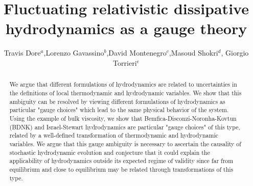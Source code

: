 \documentclass[12pt,onecolumn,showpacs,amssymb,aps,nofootinbib,floatfix]{revtex4-2}
\begin{document}
	\title{Fluctuating relativistic dissipative hydrodynamics as a gauge theory}
	\author{Travis Dore$^a$,Lorenzo Gavassino$^b$,David Montenegro$^c$,Masoud Shokri$^d$, Giorgio Torrieri$^e$}
	\begin{abstract}
		We argue that different formulations of hydrodynamics are related to uncertainties in the definitions of local thermodynamic and hydrodynamic variables. We show that this ambiguity can be resolved by viewing different formulations of hydrodynamics as particular "gauge choices" which lead to the same physical behavior of the system. Using the example of bulk viscosity, we show that Bemfica-Disconzi-Noronha-Kovtun (BDNK) and Israel-Stewart hydrodynamics are particular "gauge choices" of this type, related by a well-defined transformation of thermodynamic and hydrodynamic variables. We argue that this gauge ambiguity is necessary to ascertain the causality of stochastic hydrodynamic evolution and conjecture that it could explain the applicability of hydrodynamics outside its expected regime of validity since far from equilibrium and close to equilibrium may be related through transformations of this type.
	\end{abstract}
	\maketitle
	
\end{document}

